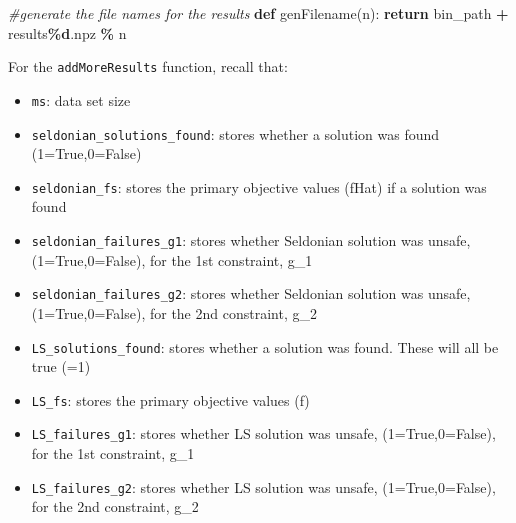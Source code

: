 \documentclass[12pt, twoside]{amherstthesis}
\newenvironment{Shaded}{\begin{snugshade}}{\end{snugshade}}
\newcommand{\CommentTok}[1]{\textcolor[rgb]{0.56,0.35,0.01}{\textit{#1}}}
\newcommand{\ControlFlowTok}[1]{\textcolor[rgb]{0.13,0.29,0.53}{\textbf{#1}}}
\newcommand{\KeywordTok}[1]{\textcolor[rgb]{0.13,0.29,0.53}{\textbf{#1}}}
\newcommand{\NormalTok}[1]{#1}
\newcommand{\OperatorTok}[1]{\textcolor[rgb]{0.81,0.36,0.00}{\textbf{#1}}}
\newcommand{\SpecialCharTok}[1]{\textcolor[rgb]{0.81,0.36,0.00}{\textbf{#1}}}
\newcommand{\StringTok}[1]{\textcolor[rgb]{0.31,0.60,0.02}{#1}}
\providecommand{\tightlist}{%
  \setlength{\itemsep}{0pt}\setlength{\parskip}{0pt}}
\begin{document}
\begin{Shaded}
\begin{Highlighting}[]
\CommentTok{\#generate the file names for the results}
\KeywordTok{def}\NormalTok{ genFilename(n):}
    \ControlFlowTok{return}\NormalTok{ bin\_path }\OperatorTok{+} \StringTok{\textquotesingle{}results}\SpecialCharTok{\%d}\StringTok{.npz\textquotesingle{}} \OperatorTok{\%}\NormalTok{ n}
\end{Highlighting}
\end{Shaded}
\noindent For the \texttt{addMoreResults} function, recall that:
\begin{itemize}
\tightlist
\item
  \texttt{ms}: data set size
\item
  \texttt{seldonian\_solutions\_found}: stores whether a solution was found (1=True,0=False)
\item
  \texttt{seldonian\_fs}: stores the primary objective values (fHat) if a solution was found
\item
  \texttt{seldonian\_failures\_g1}: stores whether Seldonian solution was unsafe, (1=True,0=False), for the 1st constraint, g\_1
\item
  \texttt{seldonian\_failures\_g2}: stores whether Seldonian solution was unsafe, (1=True,0=False), for the 2nd constraint, g\_2
\item
  \texttt{LS\_solutions\_found}: stores whether a solution was found. These will all be true (=1)
\item
  \texttt{LS\_fs}: stores the primary objective values (f)
\item
  \texttt{LS\_failures\_g1}: stores whether LS solution was unsafe, (1=True,0=False), for the 1st constraint, g\_1
\item
  \texttt{LS\_failures\_g2}: stores whether LS solution was unsafe, (1=True,0=False), for the 2nd constraint, g\_2
\end{itemize}
\end{document}
